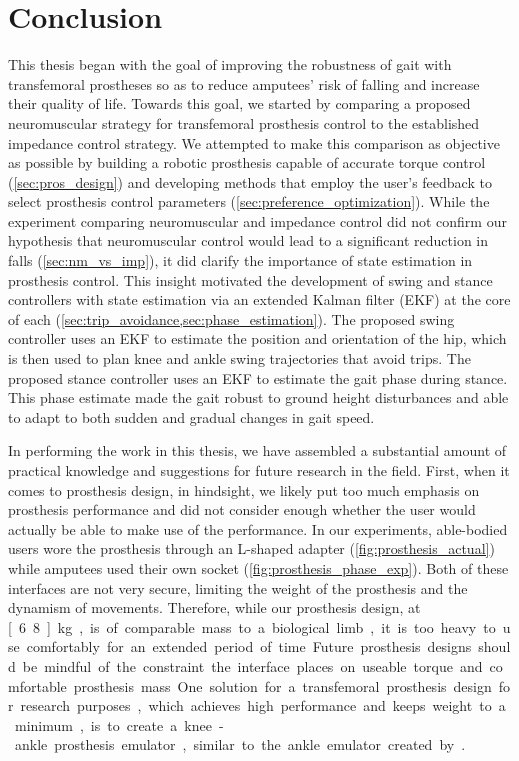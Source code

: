 \chapter{Conclusion}\label{sec:thesis_conclusion}

This thesis began with the goal of improving the robustness of gait with
transfemoral prostheses so as to reduce amputees' risk of falling and increase
their quality of life. Towards this goal, we started by comparing a proposed
neuromuscular strategy for transfemoral prosthesis control to the established
impedance control strategy. We attempted to make this comparison as objective as
possible by building a robotic prosthesis capable of accurate torque control
(\cref{sec:pros_design}) and developing methods that employ the user's feedback
to select prosthesis control parameters (\cref{sec:preference_optimization}).
While the experiment comparing neuromuscular and impedance control did not
confirm our hypothesis that neuromuscular control would lead to a significant
reduction in falls (\cref{sec:nm_vs_imp}), it did clarify the importance of
state estimation in prosthesis control. This insight motivated the development
of swing and stance controllers with state estimation via an extended Kalman
filter (EKF) at the core of each
(\cref{sec:trip_avoidance,sec:phase_estimation}). The proposed swing controller
uses an EKF to estimate the position and orientation of the hip, which is then
used to plan knee and ankle swing trajectories that avoid trips. The proposed
stance controller uses an EKF to estimate the gait phase during stance. This
phase estimate made the gait robust to ground height disturbances and able to
adapt to both sudden and gradual changes in gait speed. 

In performing the work in this thesis, we have assembled a substantial amount of
practical knowledge and suggestions for future research in the field. First,
when it comes to prosthesis design, in hindsight, we likely put too much
emphasis on prosthesis performance and did not consider enough whether the user
would actually be able to make use of the performance. In our experiments,
able-bodied users wore the prosthesis through an L-shaped adapter
(\cref{fig:prosthesis_actual}) while amputees used their own socket
(\cref{fig:prosthesis_phase_exp}). Both of these interfaces are not very secure,
limiting the weight of the prosthesis and the dynamism of movements. Therefore,
while our prosthesis design, at \unit[6.8]{kg}, is of comparable mass to a
biological limb, it is too heavy to use comfortably for an extended period of
time. Future prosthesis designs should be mindful of the constraint the
interface places on useable torque and comfortable prosthesis mass. One solution
for a transfemoral prosthesis design for research purposes, which achieves high
performance and keeps weight to a minimum, is to create a knee-ankle prosthesis
emulator, similar to the ankle emulator created by
\citet{caputo2013experimental}.

